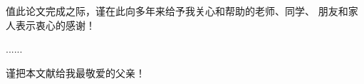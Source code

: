 
\begin{thanks}

值此论文完成之际，谨在此向多年来给予我关心和帮助的老师、同学、
朋友和家人表示衷心的感谢！

......

\vskip 18pt

谨把本文献给我最敬爱的父亲！

\end{thanks}
